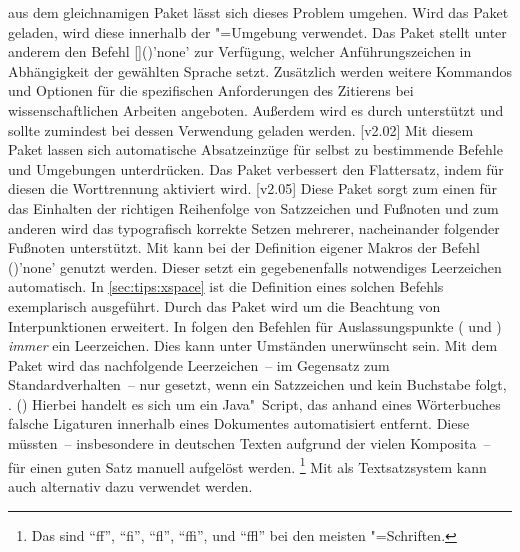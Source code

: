 \begin{DeclarePackages}[Typografie]
  aus dem gleichnamigen Paket lässt sich dieses Problem umgehen. Wird das Paket 
  geladen, wird diese innerhalb der "=Umgebung verwendet.
  Das Paket stellt unter anderem den Befehl 
  []()'none'
  zur Verfügung, welcher Anführungszeichen in Abhängigkeit der gewählten 
  Sprache setzt. Zusätzlich werden weitere Kommandos und Optionen für die 
  spezifischen Anforderungen des Zitierens bei wissenschaftlichen Arbeiten 
  angeboten. Außerdem wird es durch  unterstützt und sollte 
  zumindest bei dessen Verwendung geladen werden.
[v2.02]
  Mit diesem Paket lassen sich automatische Absatzeinzüge für selbst zu 
  bestimmende Befehle und Umgebungen unterdrücken.
  Das Paket verbessert den Flattersatz, indem für diesen die Worttrennung 
  aktiviert wird.
[v2.05]
  Diese Paket sorgt zum einen für das Einhalten der richtigen Reihenfolge von 
  Satzzeichen und Fußnoten und zum anderen wird das typografisch korrekte 
  Setzen mehrerer, nacheinander folgender Fußnoten unterstützt.
  Mit  kann bei der Definition eigener Makros der Befehl 
  ()'none' genutzt werden. Dieser setzt ein 
  gegebenenfalls notwendiges Leerzeichen automatisch. In 
  \autoref{sec:tips:xspace} ist die Definition eines solchen Befehls 
  exemplarisch ausgeführt. Durch das Paket  wird 
   um die Beachtung von Interpunktionen erweitert.
  In  folgen den Befehlen für Auslassungspunkte ( und 
  ) \emph{immer} ein Leerzeichen. Dies kann unter Umständen 
  unerwünscht sein. Mit dem Paket  wird das nachfolgende 
  Leerzeichen~-- im Gegensatz zum Standardverhalten~-- nur gesetzt, wenn ein 
  Satzzeichen und kein Buchstabe folgt, .
()
  Hierbei handelt es sich um ein Java"~Script, das anhand eines Wörterbuches 
  falsche Ligaturen innerhalb eines Dokumentes automatisiert entfernt. Diese 
  müssten~-- insbesondere in deutschen Texten aufgrund der vielen Komposita~-- 
  für einen guten Satz manuell aufgelöst werden.%
  \footnote{%
    Das sind \enquote{ff}, \enquote{fi}, \enquote{fl}, \enquote{ffi}, und 
    \enquote{ffl} bei den meisten "=Schriften.%
  }
  Mit  als Textsatzsystem kann auch  
  alternativ dazu verwendet werden.
\end{DeclarePackages}



